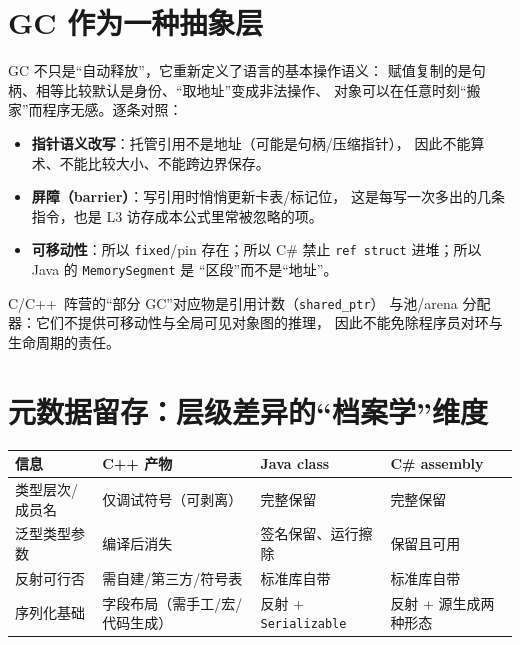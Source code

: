 \documentclass[12pt,a4paper,fontset=fandol]{ctexbook}
\newcommand{\Cplus}[1]{C++\,#1}
\begin{document}
\section{GC 作为一种抽象层}

GC 不只是``自动释放''，它重新定义了语言的基本操作语义：
赋值复制的是句柄、相等比较默认是身份、``取地址''变成非法操作、
对象可以在任意时刻``搬家''而程序无感。逐条对照：

\begin{itemize}
  \item \textbf{指针语义改写}：托管引用不是地址（可能是句柄/压缩指针），
        因此不能算术、不能比较大小、不能跨边界保存。
  \item \textbf{屏障（barrier）}：写引用时悄悄更新卡表/标记位，
        这是每写一次多出的几条指令，也是 L3 访存成本公式里常被忽略的项。
  \item \textbf{可移动性}：所以 \texttt{fixed}/pin 存在；所以 C\# 禁止
        \texttt{ref struct} 进堆；所以 Java 的 \texttt{MemorySegment} 是
        ``区段''而不是``地址''。
\end{itemize}

C/\allowbreak{}\Cplus{} 阵营的``部分 GC''对应物是引用计数（\texttt{shared\_ptr}）
与池/arena 分配器：它们不提供可移动性与全局可见对象图的推理，
因此不能免除程序员对环与生命周期的责任。

\section{元数据留存：层级差异的``档案学''维度}

\begin{longtable}{@{}>{\raggedright\arraybackslash}p{}>{\raggedright\arraybackslash}p{}>{\raggedright\arraybackslash}p{}>{\raggedright\arraybackslash}p{}@{}}
\toprule
\textbf{信息} & \textbf{C++ 产物} & \textbf{Java class} & \textbf{C\# assembly} \\
\midrule
类型层次/成员名 & 仅调试符号（可剥离） & 完整保留 & 完整保留 \\
\addlinespace
泛型类型参数 & 编译后消失 & 签名保留、运行擦除 & 保留且可用 \\
\addlinespace
反射可行否 & 需自建/第三方/符号表 & 标准库自带 & 标准库自带 \\
\addlinespace
序列化基础 & 字段布局（需手工/宏/代码生成） & 反射 + \texttt{Serializable} &
  反射 + 源生成两种形态 \\
\bottomrule
\end{longtable}
\end{document}
